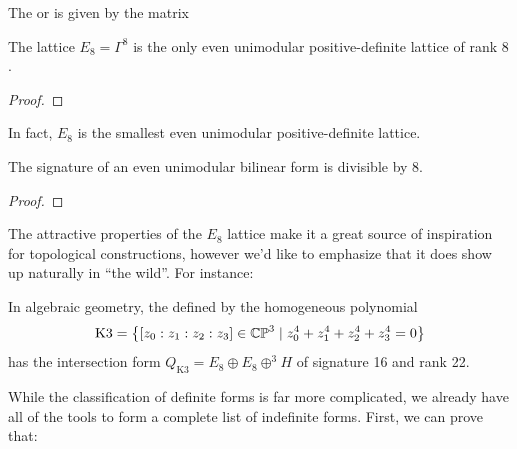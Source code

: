 \begin{definition}\label{def:E8-lattice}
	The  or  is given by the matrix
\end{definition}

\begin{theorem}[Mordell]
	The lattice $E_8=\Gamma^8$ is the only even unimodular positive-definite lattice of rank $8$.
\end{theorem}
\begin{proof}
\end{proof}

In fact, $E_8$ is the smallest even unimodular positive-definite lattice.
\begin{theorem}
	The signature of an even unimodular bilinear form is divisible by $8$.
\end{theorem}
\begin{proof}
\end{proof}

The attractive properties of the $E_8$ lattice make it a great source of inspiration for topological constructions, however we'd like to emphasize that it does show up naturally in ``the wild''. For instance:

\begin{example}
	In algebraic geometry, the  defined by the homogeneous polynomial
	\[
		\textrm{K3} = \left\{ [z_0 : z_1 : z_2 : z_3]\in \mathbb{CP}^3 \mid z_0^4 + z_1^4+z_2^4 + z_3^4=0\right\}
	\]
	has the intersection form $Q_{\textrm{K3}} = E_8\oplus E_8 \oplus^3 H$ of signature 16 and rank 22.
\end{example}

While the classification of definite forms is far more complicated, we already have all of the tools to form a complete list of indefinite forms. First, we can prove that:

